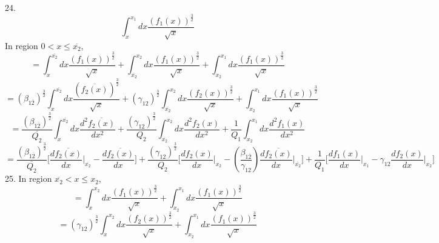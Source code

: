 \documentclass[fleqn, 10pt]{article}
\begin{document}
      24. 
      \begin{equation*}
          \int^{x_1}_{x} dx \frac{(f_1(x))^\frac{3}{2}}{\sqrt{x}} 
      \end{equation*}
      In region $0<x\leq\overline{x_2}$,
      \begin{equation*}
        = \int^{\overline{x_2}}_{x} dx \frac{(f_1(x))^\frac{3}{2}}{\sqrt{x}} + \int^{x_2}_{\overline{x_2}} dx \frac{(f_1(x))^\frac{3}{2}}{\sqrt{x}} + \int^{x_1}_{x_2} dx \frac{(f_1(x))^\frac{3}{2}}{\sqrt{x}}   
      \end{equation*}
      \begin{equation*}
          = (\beta_{1\overline{2}})^\frac{3}{2} \int^{\overline{x_2}}_{x} dx \frac{(\overline{f_2(x)})^\frac{3}{2}}{\sqrt{x}} + (\gamma_{12})^\frac{3}{2} \int^{x_2}_{\overline{x_2}} dx \frac{(f_2(x))^\frac{3}{2}}{\sqrt{x}} + \int^{x_1}_{x_2} dx \frac{(f_1(x))^\frac{3}{2}}{\sqrt{x}}
      \end{equation*}
      \begin{equation*}
          = \frac{(\beta_{1\overline{2}})^\frac{3}{2}}{\overline{Q_2}} \int^{\overline{x_2}}_{x} dx \frac{d^2\overline{f_2(x)}}{dx^2} + \frac{(\gamma_{12})^\frac{3}{2}}{Q_2} \int^{x_2}_{\overline{x_2}} dx \frac{d^2f_2(x)}{dx^2} + \frac{1}{Q_1} \int^{x_1}_{x_2} dx \frac{d^2f_1(x)}{dx^2} 
      \end{equation*}
      \begin{equation}
          =   \frac{(\beta_{1\overline{2}})^\frac{3}{2}}{\overline{Q_2}} \biggl[ \frac{d\overline{f_2(x)}}{dx} \Bigg|_{\overline{x_2}} - \frac{d\overline{f_2(x)}}{dx} \biggr] +   \frac{(\gamma_{12})^\frac{3}{2}}{Q_2} \biggl[ \frac{df_2(x)}{dx} \Bigg|_{x_2} -   \left(\frac{\beta_{1\overline{2}}}{\gamma_{12}}\right) \frac{d\overline{f_2(x)}}{dx} \Bigg|_{\overline{x_2}} \biggr] +   \frac{1}{Q_1} \biggl[ \frac{df_1(x)}{dx} \Bigg|_{x_1} -  \gamma_{12} \frac{df_2(x)}{dx} \Bigg|_{x_2} \biggr]
          \label{109}
      \end{equation}
      25. 
           In region $\overline{x_2}<x\leq x_2$,
           \begin{equation*}
               = \int^{x_2}_{x} dx \frac{(f_1(x))^\frac{3}{2}}{\sqrt{x}} + \int^{x_1}_{x_2} dx \frac{(f_1(x))^\frac{3}{2}}{\sqrt{x}}
           \end{equation*}
           \begin{equation*}
               = (\gamma_{12})^\frac{3}{2} \int^{x_2}_{x} dx \frac{(f_2(x))^\frac{3}{2}}{\sqrt{x}} + \int^{x_1}_{x_2} dx \frac{(f_1(x))^\frac{3}{2}}{\sqrt{x}}
           \end{equation*}
\end{document}
